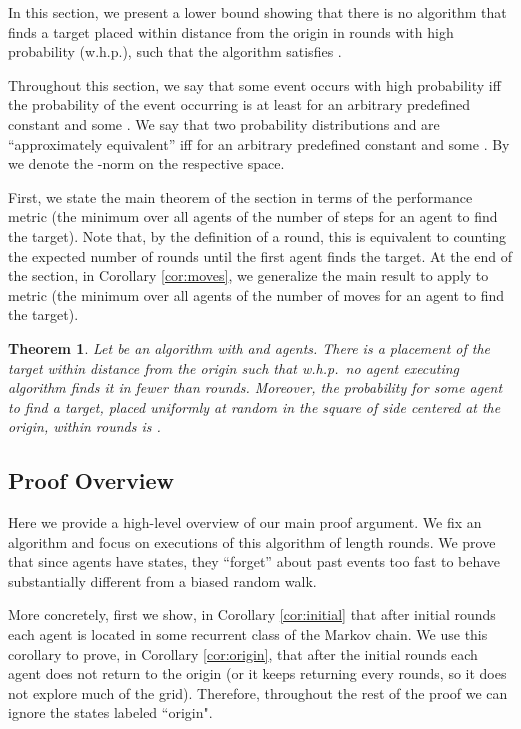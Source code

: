 \documentclass[11pt]{article}
\newtheorem{theorem}{Theorem}[section]
\begin{document}
In this section, we present a lower bound showing that there is no algorithm that finds a target placed within distance  from the origin in  rounds with high probability (w.h.p.), such that the algorithm satisfies . 

Throughout this section, we say that some event occurs with high probability iff the probability of the event occurring is at least  for an arbitrary predefined constant  and some . We say that two probability distributions  and  are ``approximately equivalent'' iff  for an arbitrary predefined constant  and some . By  we denote the -norm on the respective space.

First, we state the main theorem of the section in terms of the performance metric  (the minimum over all agents of the number of steps for an agent to find the target). Note that, by the definition of a round, this is equivalent to counting the expected number of rounds until the first agent finds the target. At the end of the section, in Corollary \ref{cor:moves}, we generalize the main result to apply to metric  (the minimum over all agents of the number of moves for an agent to find the target). 

\begin{theorem}\label{thm:lower}
	Let  be an algorithm with  and  agents. There is a placement of the target within distance  from the origin such that w.h.p.\ no agent executing algorithm  finds it in fewer than  rounds.
	Moreover, the probability for some agent to find a target, placed uniformly at random in the square of side  centered at the origin, within  rounds is .
\end{theorem}

\subsection{Proof Overview}

Here we provide a high-level overview of our main proof argument. We fix an algorithm  and focus on executions of this algorithm of length  rounds. We prove that since agents have  states, they ``forget'' about past events too fast to behave substantially different from a biased random walk. 


More concretely, first we show, in Corollary \ref{cor:initial} that after  initial rounds each agent  is located in some recurrent class  of the Markov chain. We use this corollary to prove, in Corollary \ref{cor:origin}, that after the initial  rounds each agent  does not return to the origin (or it keeps returning every  rounds, so it does not explore much of the grid). Therefore, throughout the rest of the proof we can ignore the states labeled ``origin".  
\end{document}

